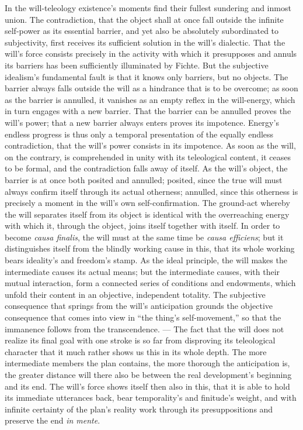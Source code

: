 \documentclass[12pt]{book}
\begin{document}
In the will-teleology existence's moments find their fullest sundering and
inmost union. The contradiction, that the object shall at once fall outside
the infinite self-power as its essential barrier, and yet also be absolutely
subordinated to subjectivity, first receives its sufficient solution in the
will's dialectic. That the will's force consists precisely in the activity
with which it presupposes and annuls its barriers has been sufficiently
illuminated by Fichte. But the subjective idealism's fundamental fault is
that it knows only barriers, but no objects. The barrier always falls
outside the will as a hindrance that is to be overcome; as soon as the
barrier is annulled, it vanishes as an empty reflex in the will-energy,
which in turn engages with a new barrier. That the barrier can be annulled
proves the will's power; that a new barrier always enters proves its
impotence. Energy's endless progress is thus only a temporal presentation of
the equally endless contradiction, that the will's power consists in its
impotence. As soon as the will, on the contrary, is comprehended in unity
with its teleological content, it ceases to be formal, and the contradiction
falls away of itself. As the will's object, the barrier is at once both
posited and annulled; posited, since the true will must always confirm
itself through its actual otherness; annulled, since this otherness is
precisely a moment in the will's own self-confirmation. The ground-act
whereby the will separates itself from its object is identical with the
overreaching energy with which it, through the object, joins itself together
with itself. In order to become \textit{causa finalis}, the will must at the
same time be \textit{causa efficiens}; but it distinguishes itself from the
blindly working cause in this, that its whole working bears ideality's and
freedom's stamp. As the ideal principle, the will makes the intermediate
causes its actual means; but the intermediate causes, with their mutual
interaction, form a connected series of conditions and endowments, which
unfold their content in an objective, independent totality. The subjective
consequence that springs from the will's anticipation grounds the objective
consequence that comes into view in ``the thing's self-movement,'' so that
the immanence follows from the transcendence. --- The fact that the will
does not realize its final goal with one stroke is so far from disproving
its teleological character that it much rather shows us this in its whole
depth. The more intermediate members the plan contains, the more thorough
the anticipation is, the greater distance will there also be between the
real development's beginning and its end. The will's force shows itself then
also in this, that it is able to hold its immediate utterances back, bear
temporality's and finitude's weight, and with infinite certainty of the
plan's reality work through its presuppositions and preserve the end
\textit{in mente}.
\end{document}
